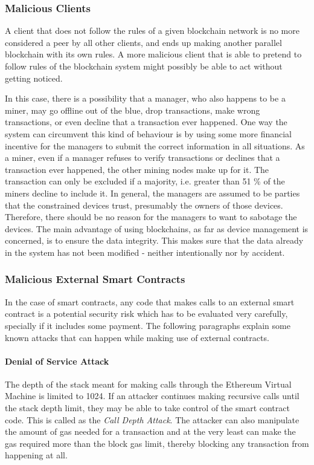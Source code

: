\documentclass[english]{tktltiki}
\begin{document}
\subsubsection{Malicious Clients}
A client that does not follow the rules of a given blockchain network is no more considered a peer by all other clients, and ends up making another parallel blockchain with its own rules. A more malicious client that is able to pretend to follow rules of the blockchain system might possibly be able to act without getting noticed. 

In this case, there is a possibility that a manager, who also happens to be a miner, may go offline out of the blue, drop transactions, make wrong transactions, or even decline that a transaction ever happened. One way the system can circumvent this kind of behaviour is by using some more financial incentive for the managers to submit the correct information in all situations. As a miner, even if a manager refuses to verify transactions or declines that a transaction ever happened, the other mining nodes make up for it. The transaction can only be excluded if a majority, i.e. greater than 51 \% of the miners decline to include it. In general, the managers are assumed to be parties that the constrained devices trust, presumably the owners of those devices. Therefore, there should be no reason for the managers to want to sabotage the devices. The main advantage of using blockchains, as far as device management is concerned, is to ensure the data integrity. This makes sure that the data already in the system has not been modified - neither intentionally nor by accident. 

\subsubsection{Malicious External Smart Contracts}

In the case of smart contracts, any code that makes calls to an external smart contract is a potential security risk which has to be evaluated very carefully, specially if it includes some payment.  The following paragraphs explain some known attacks that can happen while making use of external contracts.

\paragraph{Denial of Service Attack}
The depth of the stack meant for making calls through the Ethereum Virtual Machine is limited to 1024. If an attacker continues making recursive calls until the stack depth limit, they may be able to take control of the smart contract code. This is called as the \textit{Call Depth Attack}\cite{ethereum-safety}. The attacker can also manipulate the amount of gas needed for a transaction and at the very least can make the gas required more than the block gas limit, thereby blocking any transaction from happening at all. 
\end{document}
